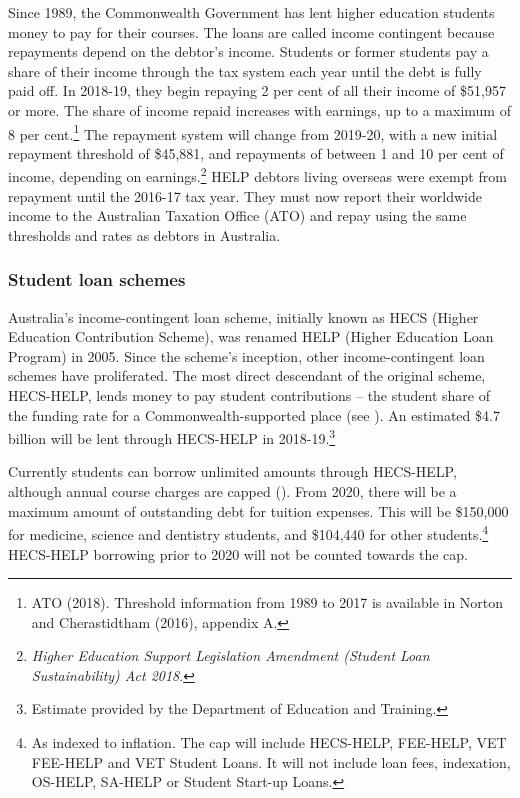 \documentclass{grattan}
\begin{document}
Since 1989, the Commonwealth Government has lent higher education students money to pay for their courses. The loans are called income contingent because repayments depend on the debtor's income. Students or former students pay a share of their income through the tax system each year until the debt is fully paid off. In 2018-19, they begin repaying 2 per cent of all their income of \$51,957 or more. The share of income repaid increases with earnings, up to a maximum of 8 per cent.\footnote{ATO (2018). Threshold information from 1989 to 2017 is available in Norton and Cherastidtham (2016), appendix A.} The repayment system will change from 2019-20, with a new initial repayment threshold of \$45,881, and repayments of between 1 and 10 per cent of income, depending on earnings.\footnote{\emph{Higher Education Support Legislation Amendment (Student Loan Sustainability) Act 2018}.} HELP debtors living overseas were exempt from repayment until the 2016-17 tax year. They must now report their worldwide income to the Australian Taxation Office (ATO) and repay using the same thresholds and rates as debtors in Australia.

%
\subsubsection{Student loan schemes}\label{subsubsec:student-loan-schemes}

Australia's income-contingent loan scheme, initially known as HECS (Higher Education Contribution Scheme), was renamed HELP (Higher Education Loan Program) in 2005. Since the scheme's inception, other income-contingent loan schemes have proliferated. The most direct descendant of the original scheme, HECS-HELP, lends money to pay student contributions -- the student share of the funding rate for a Commonwealth-supported place (see ). An estimated \$4.7 billion will be lent through HECS-HELP in 2018-19.\footnote{Estimate provided by the Department of Education and Training.}

Currently students can borrow unlimited amounts through HECS-HELP, although annual course charges are capped (). From 2020, there will be a maximum amount of outstanding debt for tuition expenses. This will be \$150,000 for medicine, science and dentistry students, and \$104,440 for other students.\footnote{As indexed to inflation. The cap will include HECS-HELP, FEE-HELP, VET FEE-HELP and VET Student Loans. It will not include loan fees, indexation, OS-HELP, SA-HELP or Student Start-up Loans.} HECS-HELP borrowing prior to 2020 will not be counted towards the cap.
\end{document}
